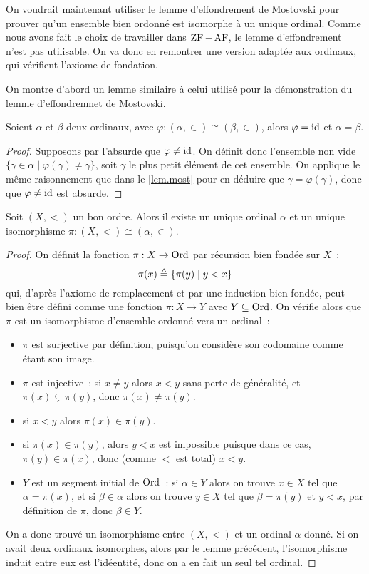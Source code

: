 On voudrait maintenant utiliser le lemme d'effondrement de Mostovski pour
prouver qu'un ensemble bien ordonné est isomorphe à un unique ordinal. Comme
nous avons fait le choix de travailler dans $\operatorname{ZF} - \operatorname{AF}$, le lemme
d'effondrement n'est pas utilisable. On va donc en remontrer une version adaptée
aux ordinaux, qui vérifient l'axiome de fondation.

On montre d'abord un lemme similaire à celui utilisé pour la démonstration du
lemme d'effondremnet de Mostovski.

\begin{lemma}
  Soient $\alpha$ et $\beta$ deux ordinaux, avec
  $\varphi : (\alpha,\in) \cong (\beta,\in)$, alors $\varphi = \operatorname{id}$ et
  $\alpha = \beta$.
\end{lemma}

\begin{proof}
  Supposons par l'absurde que $\varphi\neq\operatorname{id}$. On définit donc l'ensemble non
  vide $\{\gamma \in \alpha \mid \varphi(\gamma)\neq\gamma\}$, soit $\gamma$
  le plus petit élément de cet ensemble. On applique le même raisonnement que
  dans le \cref{lem.most} pour en déduire que $\gamma = \varphi(\gamma)$, donc
  que $\varphi\neq\operatorname{id}$ est absurde.
\end{proof}

\begin{proposition}
  Soit $(X,<)$ un bon ordre. Alors il existe un unique ordinal $\alpha$ et un
  unique isomorphisme $\pi : (X,<)\cong (\alpha,\in)$.
\end{proposition}

\begin{proof}
  On définit la fonction $\pi : X \to \operatorname{Ord}$ par récursion bien fondée sur
  $X$~:
  \[\pi(x)\triangleq \{ \pi(y) \mid y < x\}\]
  qui, d'après l'axiome de remplacement et par une induction bien fondée,
  peut bien être défini comme une fonction $\pi : X \to Y$ avec
  $Y\subseteq \operatorname{Ord}$. On vérifie alors que $\pi$ est un isomorphisme d'ensemble
  ordonné vers un ordinal~:
  \begin{itemize}
  \item $\pi$ est surjective par définition, puisqu'on considère son codomaine
    comme étant son image.
  \item $\pi$ est injective~: si $x\neq y$ alors $x < y$ sans perte de
    généralité, et $\pi(x) \subsetneq \pi(y)$, donc $\pi(x)\neq\pi(y)$.
  \item si $x < y$ alors $\pi(x) \in \pi(y)$.
  \item si $\pi(x) \in \pi(y)$, alors $y < x$ est impossible puisque dans ce
    cas, $\pi(y) \in \pi(x)$, donc (comme $<$ est total) $x < y$.
  \item $Y$ est un segment initial de $\operatorname{Ord}$~: si $\alpha \in Y$ alors on trouve
    $x \in X$ tel que $\alpha = \pi(x)$, et si $\beta \in \alpha$ alors
    on trouve $y\in X$ tel que $\beta = \pi(y)$ et $y < x$, par définition de
    $\pi$, donc $\beta \in Y$.
  \end{itemize}
  On a donc trouvé un isomorphisme entre $(X,<)$ et un ordinal $\alpha$ donné.
  Si on avait deux ordinaux isomorphes, alors par le lemme précédent,
  l'isomorphisme induit entre eux est l'idéentité, donc on a en fait un seul
  tel ordinal.
\end{proof}


